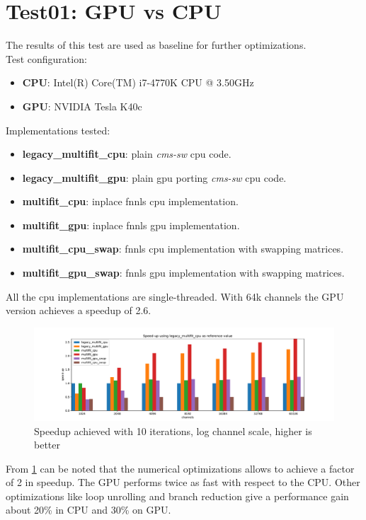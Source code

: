 \section{Test01: GPU vs CPU}
The results of this test are used as baseline for further optimizations. \\
Test configuration:
\begin{itemize}
  \item \textbf{CPU}: Intel(R) Core(TM) i7-4770K CPU @ 3.50GHz 
  \item \textbf{GPU}: NVIDIA Tesla K40c 
\end{itemize}
Implementations tested:
\begin{itemize}
  \item \textbf{legacy\_multifit\_cpu}: plain \textit{cms-sw} cpu code.
  \item \textbf{legacy\_multifit\_gpu}: plain gpu porting \textit{cms-sw} cpu code.
  \item \textbf{multifit\_cpu}: inplace fnnls cpu implementation.
  \item \textbf{multifit\_gpu}: inplace fnnls gpu implementation.
  \item \textbf{multifit\_cpu\_swap}: fnnls cpu implementation with swapping matrices.
  \item \textbf{multifit\_gpu\_swap}: fnnls gpu implementation with swapping matrices.
\end{itemize}
All the cpu implementations are single-threaded. With 64k channels the GPU version achieves a speedup of 2.6. 
\begin{figure}[h]
  \includegraphics[width=\textwidth]{img/speedup}
  \caption{Speedup achieved with 10 iterations, log channel scale, higher is better}
  \label{img:speedup01}
\end{figure}
From \ref{img:speedup01} can be noted that the numerical optimizations allows to achieve a factor of 2 in speedup. The GPU performs twice as fast with respect to the CPU. Other optimizations like loop unrolling and branch reduction give a performance gain about 20\% in CPU and 30\% on GPU.  
